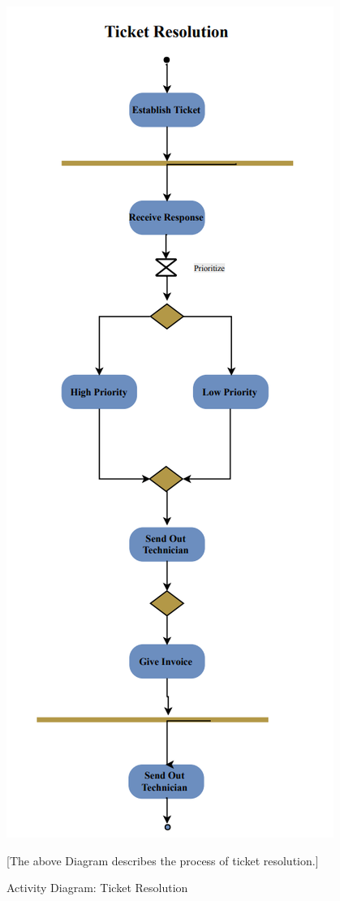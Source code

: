 \documentclass[letterpaper]{article}
\begin{document}
\begin{figure}[htbp]
  \includegraphics[]{AD_TicketRes}
  \caption{Activity Diagram: Ticket Resolution}[The above Diagram describes the process of ticket resolution.]
  \centering
\end{figure}
\end{document}
